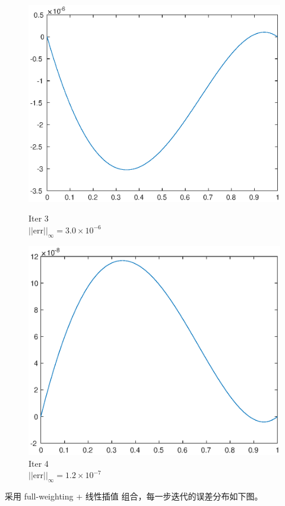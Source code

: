 \documentclass[lang=cn,10pt]{elegantbook}
\begin{document}
\begin{figure}[H]
\begin{minipage}[t]{0.24\linewidth}
    \includegraphics[width=0.9\linewidth]{figure/1-5-3.eps}
    \caption*{\small Iter 3 \\ $||\text{err}||_\infty=3.0\times 10^{-6}$}
  \end{minipage}
  \begin{minipage}[t]{0.24\linewidth}
    \centering
    \includegraphics[width=0.9\linewidth]{figure/1-5-4.eps}
    \caption*{\small Iter 4 \\ $||\text{err}||_\infty=1.2\times 10^{-7}$}
  \end{minipage}
\end{figure}

采用 full-weighting + 线性插值 组合，每一步迭代的误差分布如下图。
\end{document}
